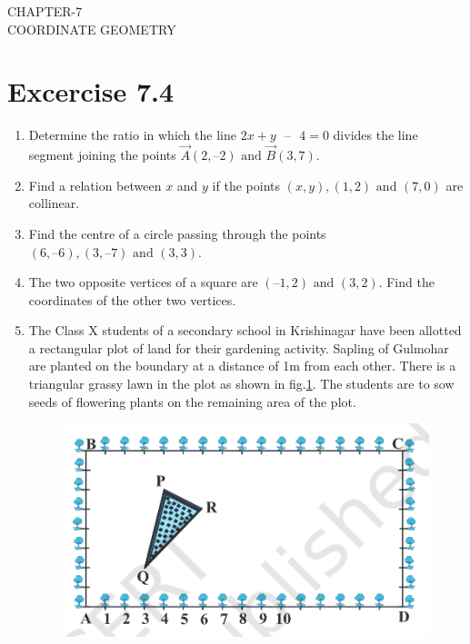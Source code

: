 \documentclass[12pt]{article}
\begin{document}
\begin{center}
\textbf\large{CHAPTER-7 \\ COORDINATE GEOMETRY}

\end{center}
\section*{Excercise 7.4}

\begin{enumerate}
\item Determine the ratio in which the line $2x+y \text{ } –\text{ } 4=0$ divides the line segment joining the points $\vec{A}(2, – 2) \text{ and } \vec{B}(3, 7)$.

\item Find a relation between $x$ and $y$ if the points $(x, y), (1, 2) \text{ and } (7, 0)$ are collinear.

\item Find the centre of a circle passing through the points $(6, – 6), (3, – 7) \text{ and } (3, 3)$.

\item The two opposite vertices of a square are $(–1, 2) \text{ and } (3, 2)$. Find the coordinates of the other two vertices.

\item The Class X students of a secondary school in Krishinagar have been allotted a rectangular plot of land for their gardening activity. Sapling of Gulmohar are planted on the boundary at a distance of 1m from each other. There is a triangular grassy lawn in the plot as shown in fig.\ref{fig:Fig1}. The students are to sow seeds of flowering plants on the remaining area of the plot.\\

\begin{figure}[!h]
	\begin{center} 
	    \includegraphics[width=\columnwidth]{figs/ss}
	\end{center}
\caption{}
\label{fig:Fig1}
\end{figure}


\end{enumerate}
\end{document}
